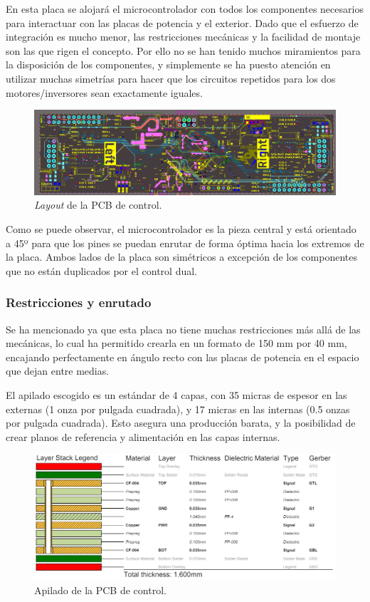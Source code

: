 En esta placa se alojará el microcontrolador con todos los componentes necesarios para interactuar con las placas de potencia y el exterior. Dado que el esfuerzo de integración es mucho menor, las restricciones mecánicas y la facilidad de montaje son las que rigen el concepto. Por ello no se han tenido muchos miramientos para la disposición de los componentes, y simplemente se ha puesto atención en utilizar muchas simetrías para hacer que los circuitos repetidos para los dos motores/inversores sean exactamente iguales.

\begin{figure}[H]
	\centering
	\includegraphics[width=0.8\linewidth]{fig/controlLayout}
	\caption{\textit{Layout} de la PCB de control.}
\end{figure}

Como se puede observar, el microcontrolador es la pieza central y está orientado a 45º para que los pines se puedan enrutar de forma óptima hacia los extremos de la placa. Ambos lados de la placa son simétricos a excepción de los componentes que no están duplicados por el control dual.

\subsubsection{Restricciones y enrutado}

Se ha mencionado ya que esta placa no tiene muchas restricciones más allá de las mecánicas, lo cual ha permitido crearla en un formato de 150 mm por 40 mm, encajando perfectamente en ángulo recto con las placas de potencia en el espacio que dejan entre medias. 

El apilado escogido es un estándar de 4 capas, con 35 micras de espesor en las externas (1 onza por pulgada cuadrada), y 17 micras en las internas (0.5 onzas por pulgada cuadrada). Esto asegura una producción barata, y la posibilidad de crear planos de referencia y alimentación en las capas internas.

\begin{figure}[H]
	\centering
	\includegraphics[width=0.7\linewidth]{fig/stackup_control}
	\caption{Apilado de la PCB de control.}
\end{figure}

